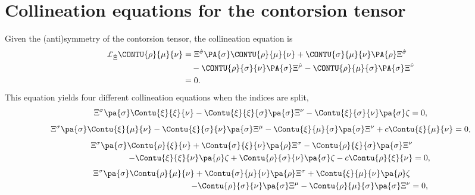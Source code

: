 \documentclass[aps,prd,12pt,superscriptaddress,showpacs,showkeys,reprint]{revtex4-1}
\begin{document}
\section{Collineation equations for the contorsion tensor}

Given the (anti)symmetry of the contorsion tensor, the collineation equation is
\begin{equation}
  \begin{split}
    \pounds_{\hat{\Xi}} \CONTU{\rho}{\mu}{\nu} &= \Xi^{\hat{\sigma}} \PA{\sigma} \CONTU{\rho}{\mu}{\nu} + \CONTU{\sigma }{\mu}{\nu} \PA{\rho} \Xi^{\hat{\sigma}} \\
    & \quad - \CONTU{\rho }{\sigma}{\nu} \PA{\sigma} \Xi^{\hat{\mu}} - \CONTU{\rho}{\mu}{\sigma} \PA{\sigma} \Xi^{\hat{\nu}} \\
    &= 0.
  \end{split}
\end{equation}
This equation yields four different collineation equations when the indices are split,
\begin{equation}
    \Xi^\sigma \pa{\sigma} \Contu{\xi}{\xi}{\nu} - \Contu{\xi}{\xi}{\sigma} \pa{\sigma} \Xi^\nu - \Contu{\xi}{\sigma}{\nu} \pa{\sigma} \zeta = 0,
\end{equation}
\begin{equation}
  \Xi^\sigma \pa{\sigma} \Contu{\xi}{\mu}{\nu} - \Contu{\xi}{\sigma}{\nu} \pa{\sigma} \Xi^\mu - \Contu{\xi}{\mu}{\sigma} \pa{\sigma} \Xi^\nu + c \Contu{\xi}{\mu}{\nu} = 0,
\end{equation}
\begin{equation}
  \begin{split}
    \Xi^\sigma \pa{\sigma} \Contu{\rho}{\xi}{\nu} + \Contu{\sigma}{\xi}{\nu} \pa{\rho} \Xi^\sigma - \Contu{\rho}{\xi}{\sigma} \pa{\sigma} \Xi^\nu & \\
    - \Contu{\xi}{\xi}{\nu} \pa{\rho} \zeta + \Contu{\rho}{\sigma}{\nu} \pa{\sigma} \zeta - c \Contu{\rho}{\xi}{\nu} &= 0,
  \end{split}
\end{equation}
\begin{equation}
  \begin{split}
    \Xi^\sigma \pa{\sigma} \Contu{\rho}{\mu}{\nu} + \Contu{\sigma}{\mu}{\nu} \pa{\rho} \Xi^\sigma + \Contu{\xi}{\mu}{\nu} \pa{\rho} \zeta & \\
    - \Contu{\rho}{\sigma}{\nu} \pa{\sigma} \Xi^\mu - \Contu{\rho}{\mu}{\sigma} \pa{\sigma} \Xi^\nu &= 0,
  \end{split}  
\end{equation}
\end{document}
